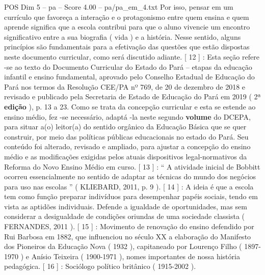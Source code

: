 \begin{textsample}{POS Dim 5 – pa – Score 4.00 – pa/pa\_em\_4.txt}
Por isso, pensar em um currículo que favoreça a interação e o protagonismo entre quem ensina e quem aprende significa que a escola contribui para que o aluno vivencie um encontro significativo entre a sua biografia ( vida ) e a história.
Nesse sentido, alguns princípios são fundamentais para a efetivação das questões que estão dispostas neste documento curricular, como será discutido adiante. [ 12 ] : Esta seção refere -se ao texto do Documento Curricular do Estado do Pará – etapas da educação infantil e ensino fundamental, aprovado pelo Conselho Estadual de Educação do Pará nos termos da Resolução CEE/PA nº 769, de 20 de dezembro de 2018 e revisado e publicado pela Secretaria de Estado de Educação do Pará em 2019 ( 2ª \textbf{edição} ), p. 13 a 23.
Como se trata da concepção curricular e esta se estende ao ensino médio, fez -se necessário, adaptá -la neste segundo \textbf{volume} do DCEPA, para situar a(o) leitor(a) do sentido orgânico da Educação Básica que se quer construir, por meio das políticas públicas educacionais no estado do Pará.
Seu conteúdo foi alterado, revisado e ampliado, para ajustar a concepção do ensino médio e as modificações exigidas pelos atuais dispositivos legal-normativos da Reforma do Novo Ensino Médio em curso. [ 13 ] : “ A atividade inicial de Bobbitt ocorreu essencialmente no sentido de adaptar as técnicas do mundo dos negócios para uso nas escolas ” ( KLIEBARD, 2011, p. 9 ). [ 14 ] : A ideia é que a escola tem como função preparar indivíduos para desempenhar papéis sociais, tendo em vista as aptidões individuais.
Defende a igualdade de oportunidades, mas sem considerar a desigualdade de condições oriundas de uma sociedade classista ( FERNANDES, 2011 ). [ 15 ] : Movimento de renovação do ensino defendido por Rui Barbosa em 1882, que influenciou no século XX a elaboração do Manifesto dos Pioneiros da Educação Nova ( 1932 ), capitaneado por Lourenço Filho ( 1897-1970 ) e Anísio Teixeira ( 1900-1971 ), nomes importantes de nossa história pedagógica. [ 16 ] : Sociólogo político britânico ( 1915-2002 ).

\end{textsample}
